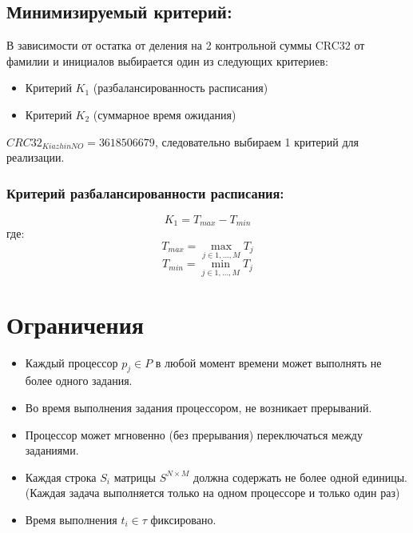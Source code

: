 \documentclass[openany, twoside, a4paper, 12pt]{extbook}
\begin{document}
    \subsection*{Минимизируемый критерий:}
        В зависимости от остатка от деления на 2 контрольной суммы CRC32 от фамилии и инициалов выбирается один из следующих критериев:
        \begin{itemize}
            \item Критерий $K_1$ (разбалансированность расписания)
            \item Критерий $K_2$ (суммарное время ожидания)
        \end{itemize}
        
        $CRC32_{KiazhinNO} = 3618506679$, следовательно выбираем 1 критерий для реализации.

        \subsubsection*{Критерий разбалансированности расписания:}

        \begin{equation}
            K_1 = T_{max} - T_{min}
        \end{equation}
        где:
        \begin{equation}
            T_{max}= \max_{j \in {1, \dots, M}}T_j
        \end{equation}
        \begin{equation}
            T_{min} = \min_{j \in {1, \dots, M}}T_j
        \end{equation}
        
\section*{Ограничения}

    \begin{itemize}
        \item Каждый процессор $p_j \in P$ в любой момент времени может выполнять не более одного задания.
        \item Во время выполнения задания процессором, не возникает прерываний.
        \item Процессор может мгновенно (без прерывания) переключаться между заданиями.
        \item Каждая строка $S_i$ матрицы $S^{N \times M}$ должна содержать не более одной единицы. (Каждая задача выполняется только на одном процессоре и только один раз)
        \item Время выполнения $t_i \in \tau$ фиксировано.
    \end{itemize}
\newpage
\end{document}

